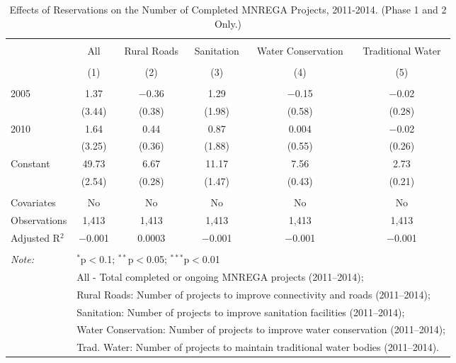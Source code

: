 
\begin{table}[!htbp] \centering 
  \caption{Effects of Reservations on the Number of Completed MNREGA Projects, 2011-2014. (Phase 1 and 2 Only.)} 
  \label{main_mnrega_phase_1_2} 
\scriptsize 
\begin{tabular}{@{\extracolsep{1pt}}lccccc} 
\\[-1.8ex]\hline 
\hline \\[-1.8ex] 
 & All & Rural Roads & Sanitation & Water Conservation & Traditional Water \\ 
\\[-1.8ex] & (1) & (2) & (3) & (4) & (5)\\ 
\hline \\[-1.8ex] 
 2005 & 1.37 & $-$0.36 & 1.29 & $-$0.15 & $-$0.02 \\ 
  & (3.44) & (0.38) & (1.98) & (0.58) & (0.28) \\ 
  2010 & 1.64 & 0.44 & 0.87 & 0.004 & $-$0.02 \\ 
  & (3.25) & (0.36) & (1.88) & (0.55) & (0.26) \\ 
  Constant & 49.73 & 6.67 & 11.17 & 7.56 & 2.73 \\ 
  & (2.54) & (0.28) & (1.47) & (0.43) & (0.21) \\ 
 \hline \\[-1.8ex] 
Covariates & No & No & No & No & No \\ 
Observations & 1,413 & 1,413 & 1,413 & 1,413 & 1,413 \\ 
Adjusted R$^{2}$ & $-$0.001 & 0.0003 & $-$0.001 & $-$0.001 & $-$0.001 \\ 
\hline 
\hline \\[-1.8ex] 
\textit{Note:}  & \multicolumn{5}{l}{$^{*}$p$<$0.1; $^{**}$p$<$0.05; $^{***}$p$<$0.01} \\ 
 & \multicolumn{5}{l}{All - Total completed or ongoing MNREGA projects (2011--2014);} \\ 
 & \multicolumn{5}{l}{Rural Roads: Number of projects to improve connectivity and roads (2011--2014);} \\ 
 & \multicolumn{5}{l}{Sanitation:  Number of projects to improve sanitation facilities  (2011--2014);} \\ 
 & \multicolumn{5}{l}{Water Conservation: Number of projects to improve water conservation (2011--2014);} \\ 
 & \multicolumn{5}{l}{Trad. Water: Number of projects to maintain traditional water bodies (2011--2014).} \\ 
\end{tabular} 
\end{table} 

